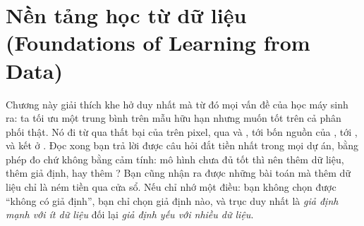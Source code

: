\documentclass[../../deep_learning.tex]{subfiles}
\begin{document}
\chapter{Nền tảng học từ dữ liệu (Foundations of Learning from Data)}

\begin{tomtat}
Chương này giải thích khe hở duy nhất mà từ đó mọi vấn đề của học máy sinh ra: ta tối ưu một trung bình trên mẫu hữu hạn nhưng muốn tốt trên cả phân phối thật. Nó đi từ  qua thất bại của  trên pixel, qua  và , tới bốn nguồn của , tới , và kết ở . Đọc xong bạn trả lời được câu hỏi đắt tiền nhất trong mọi dự án, bằng phép đo chứ không bằng cảm tính: mô hình chưa đủ tốt thì nên thêm dữ liệu, thêm giả định, hay thêm ? Bạn cũng nhận ra được những bài toán mà thêm dữ liệu chỉ là ném tiền qua cửa sổ. Nếu chỉ nhớ một điều: bạn không chọn được ``không có giả định'', bạn chỉ chọn giả định nào, và trục duy nhất là \emph{giả định mạnh với ít dữ liệu} đối lại \emph{giả định yếu với nhiều dữ liệu}.
\end{tomtat}
\end{document}
